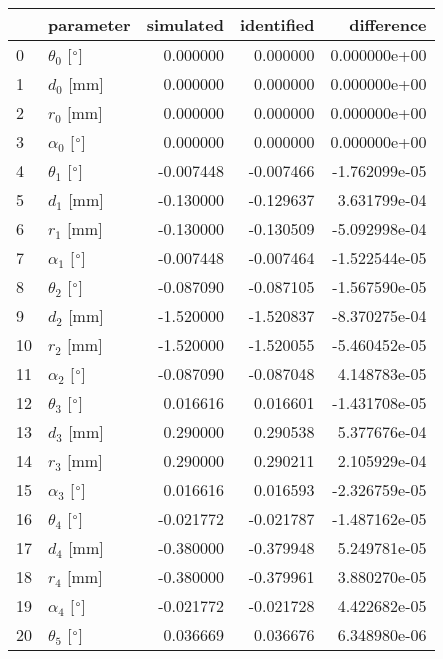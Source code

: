 \documentclass{standalone}%
\begin{document}
%
\normalsize%
\begin{tabular}{llrrr}
\toprule
{} &                 parameter & simulated & identified &    difference \\
\midrule
0  &  $\theta_{0}$ [$\degree$] &  0.000000 &   0.000000 &  0.000000e+00 \\
1  &              $d_{0}$ [mm] &  0.000000 &   0.000000 &  0.000000e+00 \\
2  &              $r_{0}$ [mm] &  0.000000 &   0.000000 &  0.000000e+00 \\
3  &  $\alpha_{0}$ [$\degree$] &  0.000000 &   0.000000 &  0.000000e+00 \\
4  &  $\theta_{1}$ [$\degree$] & -0.007448 &  -0.007466 & -1.762099e-05 \\
5  &              $d_{1}$ [mm] & -0.130000 &  -0.129637 &  3.631799e-04 \\
6  &              $r_{1}$ [mm] & -0.130000 &  -0.130509 & -5.092998e-04 \\
7  &  $\alpha_{1}$ [$\degree$] & -0.007448 &  -0.007464 & -1.522544e-05 \\
8  &  $\theta_{2}$ [$\degree$] & -0.087090 &  -0.087105 & -1.567590e-05 \\
9  &              $d_{2}$ [mm] & -1.520000 &  -1.520837 & -8.370275e-04 \\
10 &              $r_{2}$ [mm] & -1.520000 &  -1.520055 & -5.460452e-05 \\
11 &  $\alpha_{2}$ [$\degree$] & -0.087090 &  -0.087048 &  4.148783e-05 \\
12 &  $\theta_{3}$ [$\degree$] &  0.016616 &   0.016601 & -1.431708e-05 \\
13 &              $d_{3}$ [mm] &  0.290000 &   0.290538 &  5.377676e-04 \\
14 &              $r_{3}$ [mm] &  0.290000 &   0.290211 &  2.105929e-04 \\
15 &  $\alpha_{3}$ [$\degree$] &  0.016616 &   0.016593 & -2.326759e-05 \\
16 &  $\theta_{4}$ [$\degree$] & -0.021772 &  -0.021787 & -1.487162e-05 \\
17 &              $d_{4}$ [mm] & -0.380000 &  -0.379948 &  5.249781e-05 \\
18 &              $r_{4}$ [mm] & -0.380000 &  -0.379961 &  3.880270e-05 \\
19 &  $\alpha_{4}$ [$\degree$] & -0.021772 &  -0.021728 &  4.422682e-05 \\
20 &  $\theta_{5}$ [$\degree$] &  0.036669 &   0.036676 &  6.348980e-06 \\

\end{tabular}
\end{document}
